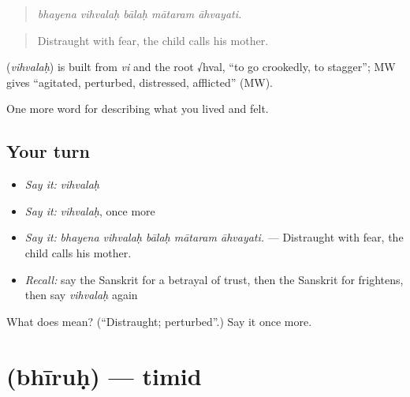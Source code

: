 \begin{quote}
    
\end{quote}

\begin{quote}
\emph{bhayena vihvalaḥ bālaḥ mātaram āhvayati.}
\end{quote}

\begin{quote}
Distraught with fear, the child calls his mother.
\end{quote}

\begin{cousinweb}
\textbf{} (\emph{vihvalaḥ}) is built from \emph{vi} and the root √hval, \textquotedblleft{}to go crookedly, to stagger\textquotedblright{}; MW gives \textquotedblleft{}agitated, perturbed, distressed, afflicted\textquotedblright{} (MW).
\end{cousinweb}

\begin{grammarlens}[title={What you've built}]
One more word for describing what you lived and felt.
\end{grammarlens}

\subsection*{Your turn}
\begin{itemize}
\raggedright
  \item \emph{Say it:} \emph{vihvalaḥ}
  \item \emph{Say it:} \emph{vihvalaḥ}, once more
  \item \emph{Say it:} \emph{bhayena vihvalaḥ bālaḥ mātaram āhvayati.} — Distraught with fear, the child calls his mother.
  \item \emph{Recall:} say the Sanskrit for a betrayal of trust, then the Sanskrit for frightens, then say \emph{vihvalaḥ} again
\end{itemize}

\begin{tcolorbox}[breakable,colback=teal!4,colframe=teal!35!black,title={Before you move on}]
What does  mean? (\textquotedblleft{}Distraught; perturbed\textquotedblright{}.) Say it once more.
\end{tcolorbox}
\section[\texorpdfstring{\sk{भीरुः} (bhīruḥ)}{भीरुः (bhīruḥ)}]{ (bhīruḥ) — timid}

